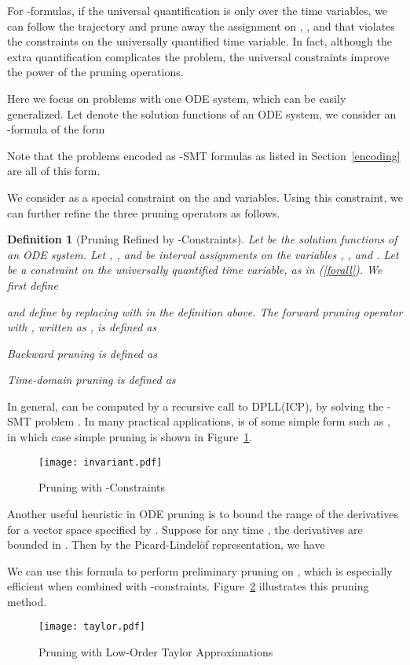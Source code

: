 \documentclass[12pt]{article}
\newtheorem{definition}[theorem]{Definition}
\begin{document}
For -formulas, if the universal quantification is only over the time variables, we can follow the trajectory and prune away the assignment on , , and  that violates the constraints on the universally quantified time variable. In fact, although the extra quantification complicates the problem, the universal constraints improve the power of the pruning operations.

Here we focus on problems with one ODE system, which can be easily generalized. Let  denote the solution functions of an ODE system, we consider an -formula of the form

Note that the problems encoded as -SMT formulas as listed in Section~\ref{encoding} are all of this form.

We consider  as a special constraint on the  and  variables. Using this constraint, we can further refine the three pruning operators as follows.
\begin{definition}[Pruning Refined by -Constraints]
Let  be the solution functions of an ODE system. Let , , and  be interval assignments on the variables , , and . Let  be a constraint on the universally quantified time variable, as in (\ref{forall}).
We first define

and define  by replacing  with  in the definition above. The forward pruning operator with , written as , is defined as

Backward pruning  is defined as

Time-domain pruning  is defined as

\end{definition}
In general,  can be computed by a recursive call to DPLL(ICP), by solving the -SMT problem . In many practical applications,  is of some simple form such as , in which case simple pruning is shown in Figure~\ref{inv}.
\begin{figure}
\begin{center}
\texttt{[image: invariant.pdf]}
\end{center}
\caption{Pruning with -Constraints}\label{inv}
\end{figure}
Another useful heuristic in ODE pruning is to bound the range of the derivatives for a vector space specified by . Suppose for any time , the derivatives  are bounded in . Then by the Picard-Lindel\"of representation, we have

We can use this formula to perform preliminary pruning on , which is especially efficient when combined with -constraints. Figure~\ref{taylor} illustrates this pruning method.
\begin{figure}
\begin{center}
\texttt{[image: taylor.pdf]}
\end{center}
\caption{Pruning with Low-Order Taylor Approximations}\label{taylor}
\end{figure}
\end{document}
